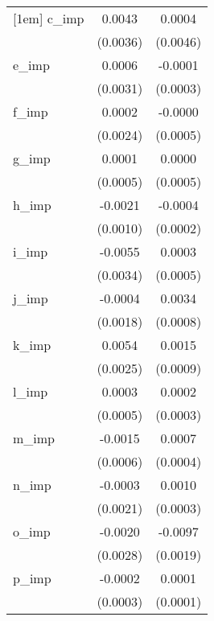 {\begin{tabular}{l*{2}{c}}
[1em]
c\_imp       &      0.0043        &      0.0004        \\
            &    (0.0036)        &    (0.0046)        \\
[1em]
e\_imp       &      0.0006        &     -0.0001        \\
            &    (0.0031)        &    (0.0003)        \\
[1em]
f\_imp       &      0.0002        &     -0.0000        \\
            &    (0.0024)        &    (0.0005)        \\
[1em]
g\_imp       &      0.0001        &      0.0000        \\
            &    (0.0005)        &    (0.0005)        \\
[1em]
h\_imp       &     -0.0021\sym{**}&     -0.0004\sym{*} \\
            &    (0.0010)        &    (0.0002)        \\
[1em]
i\_imp       &     -0.0055        &      0.0003        \\
            &    (0.0034)        &    (0.0005)        \\
[1em]
j\_imp       &     -0.0004        &      0.0034\sym{**}\\
            &    (0.0018)        &    (0.0008)        \\
[1em]
k\_imp       &      0.0054\sym{**}&      0.0015\sym{*} \\
            &    (0.0025)        &    (0.0009)        \\
[1em]
l\_imp       &      0.0003        &      0.0002        \\
            &    (0.0005)        &    (0.0003)        \\
[1em]
m\_imp       &     -0.0015\sym{**}&      0.0007\sym{*} \\
            &    (0.0006)        &    (0.0004)        \\
[1em]
n\_imp       &     -0.0003        &      0.0010\sym{**}\\
            &    (0.0021)        &    (0.0003)        \\
[1em]
o\_imp       &     -0.0020        &     -0.0097\sym{**}\\
            &    (0.0028)        &    (0.0019)        \\
[1em]
p\_imp       &     -0.0002        &      0.0001        \\
            &    (0.0003)        &    (0.0001)        \\

\end{tabular}}
